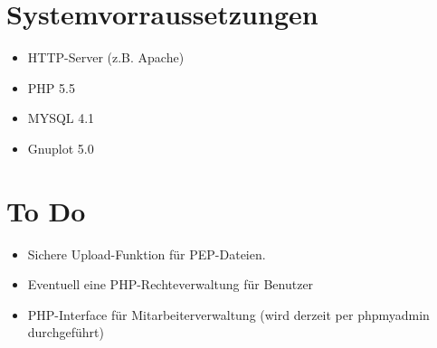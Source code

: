 \documentclass[10pt,a4paper,titlepage,oneside]{article}
\begin{document}
\section{Systemvorraussetzungen}
	\begin{itemize}
		\item HTTP-Server (z.B. Apache)
		\item PHP 5.5
		\item MYSQL 4.1
		\item Gnuplot 5.0
	\end{itemize}










\section{To Do}
\begin{itemize}
	\item Sichere Upload-Funktion für PEP-Dateien.
	\item Eventuell eine PHP-Rechteverwaltung für Benutzer
	\item PHP-Interface für Mitarbeiterverwaltung (wird derzeit per phpmyadmin durchgeführt)
\end{itemize}
\end{document}

